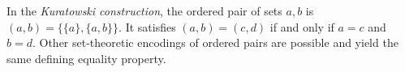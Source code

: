 
In the \emph{Kuratowski construction}, the ordered pair of sets $a,b$ is $(a,b)=\{\{a\},\{a,b\}\}$. It satisfies $(a,b)=(c,d)$ if and only if $a=c$ and $b=d$. Other set-theoretic encodings of ordered pairs are possible and yield the same defining equality property.
